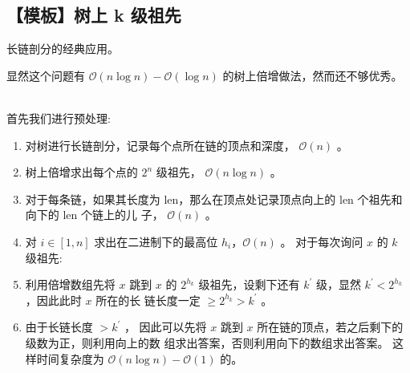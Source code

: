 \subsection{【模板】树上 k 级祖先}
\par \noindent 长链剖分的经典应用。

\par \noindent 显然这个问题有 $\mathcal{O}(n \log n)-\mathcal{O}(\log n)$ 的树上倍增做法，然而还不够优秀。
~\\
\par \noindent 首先我们进行预处理:

\begin{enumerate}
\item 对树进行长链剖分，记录每个点所在链的顶点和深度， $\mathcal{O}(n)$ 。
\item 树上倍增求出每个点的 $2^n$ 级祖先， $\mathcal{O}(n \log n)$ 。
\item 对于每条链，如果其长度为 len，那么在顶点处记录顶点向上的 len 个祖先和向下的 len 个链上的儿 子， $\mathcal{O}(n)$ 。
\item 对 $i \in[1, n]$ 求出在二进制下的最高位 $h_i$，$\mathcal{O}(n)$ 。
   对于每次询问 $x$ 的 $k$ 级祖先:
\item 利用倍增数组先将 $x$ 跳到 $x$ 的 $2^{h_k}$ 级祖先，设剩下还有 $k^{\prime}$ 级，显然 $k^{\prime}<2^{h_k}$ ，因此此时 $x$ 所在的长 链长度一定 $\geq 2^{h_k}>k^{\prime}$ 。
\item 由于长链长度 $>k^{\prime}$ ， 因此可以先将 $x$ 跳到 $x$ 所在链的顶点，若之后剩下的级数为正，则利用向上的数 组求出答案，否则利用向下的数组求出答案。
   这样时间复杂度为 $\mathcal{O}(n \log n)-\mathcal{O}(1)$ 的。
\end{enumerate}
